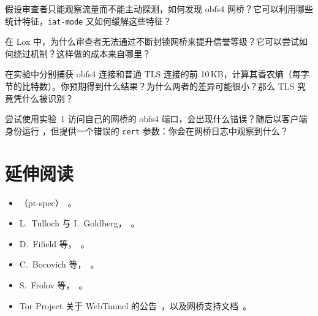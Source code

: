 \begin{esercizio}[2]\label{es:16-sondaggio}
假设审查者只能观察流量而不能主动探测，如何发现 obfs4 网桥？它可以利用哪些统计特征，\texttt{iat-mode} 又如何缓解这些特征？
\end{esercizio}

\begin{esercizio}[2]\label{es:16-lox}
在 Lox 中，为什么审查者无法通过不断封锁网桥来提升信誉等级？它可以尝试如何绕过机制？这样做的成本来自哪里？
\end{esercizio}

\begin{esercizio}[2]\label{es:16-entropia}
在实验中分别捕获 obfs4 连接和普通 TLS 连接的前 10\,KB，计算其香农熵（每字节的比特数）。你预期得到什么结果？为什么两者的差异可能很小？那么 TLS 究竟凭什么被识别？
\end{esercizio}

\begin{esercizio}[3]\label{es:16-sondaggio-lab}
尝试使用实验~1 访问自己的网桥的 obfs4 端口，会出现什么错误？随后以客户端身份运行 ，但提供一个错误的 \texttt{cert} 参数：你会在网桥日志中观察到什么？
\end{esercizio}

\section*{延伸阅读}
\begin{itemize}
  \item {}（pt-spec）~\cite{torspec}。
  \item L.~Tulloch 与 I.~Goldberg，~\cite{tulloch2023lox}。
  \item D.~Fifield 等，~\cite{fifield2015fronting}。
  \item C.~Bocovich 等，~\cite{bocovich2024snowflake}。
  \item S.~Frolov 等，~\cite{frolov2019conjure}。
  \item Tor Project 关于 WebTunnel 的公告~\cite{torblogwebtunnel}，以及网桥支持文档~\cite{torsupport}。
\end{itemize}
